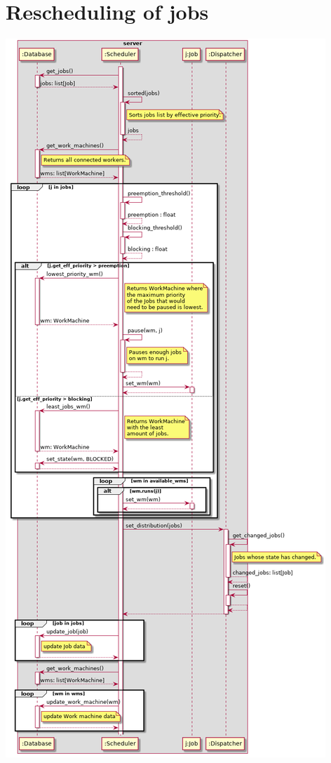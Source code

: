     \section{Rescheduling of jobs}
            \includegraphics[height=0.95\textheight]{sequence/scheduler-low.png}
